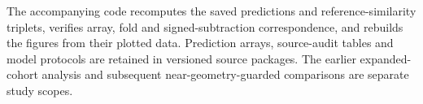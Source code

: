 The accompanying code recomputes the saved predictions and reference-similarity triplets, verifies array, fold and signed-subtraction correspondence, and rebuilds the figures from their plotted data. Prediction arrays, source-audit tables and model protocols are retained in versioned source packages. The earlier expanded-cohort analysis and subsequent near-geometry-guarded comparisons are separate study scopes.
